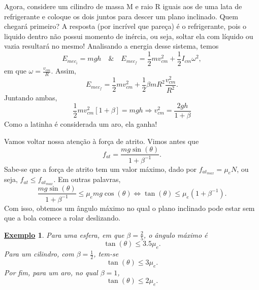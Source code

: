 \documentclass{article}
\newtheorem{example}{\underline{Exemplo}}
\begin{document}
Agora, considere um cilindro de massa M e raio R iguais aos de uma lata de refrigerante e coloque os dois juntos para descer um plano inclinado. Quem chegará primeiro?
A resposta (por incrível que pareça) é o refrigerante, pois o liquido dentro não possui momento de inércia, ou seja, soltar ela com líquido ou vazia resultará no mesmo! Analisando a energia
desse sistema, temos 
\[
  E_{mec_{i}} = mgh\quad \&\quad E_{mec_{f}} = \frac{1}{2}mv_{cm}^{2} + \frac{1}{2}I_{cm}\omega^{2},
\]
em que \(\omega = \frac{v_{cm}}{R}\). Assim, 
\[
  E_{mec_{f}}=\frac{1}{2}mv_{cm}^{2} + \frac{1}{2}\beta mR^{2}\frac{v_{cm}^{2}}{R^{2}}.
\]
Juntando ambas, 
\[
  \frac{1}{2}mv_{cm}^{2}[1+\beta ] = mgh \Rightarrow v_{cm}^{2} = \frac{2gh}{1+\beta }
\]
Como a latinha é considerada um aro, ela ganha!

Vamos voltar nossa atenção à força de atrito. Vimos antes que 
\[
  f_{at} = \frac{mg\sin{(\theta )}}{1 + \beta^{-1}}.
\]
Sabe-se que a força de atrito tem um valor máximo, dado por \(f_{at_{max}} = \mu_{e}N\), ou seja,
\(f_{at}\leq f_{at_{max}}\). Em outras palavras, 
\[
  \frac{mg\sin{(\theta )}}{1+\beta^{-1}}\leq \mu_{e}mg\cos{(\theta )} \Longleftrightarrow \tan{(\theta )}\leq \mu_{e}(1+\beta^{-1}).
\]
Com isso, obtemos um ângulo máximo no qual o plano inclinado pode estar sem que a bola comece a rolar deslizando.
\begin{example}
  Para uma esfera, em que \(\beta =\frac{2}{5}\), o ângulo máximo é 
  \[
    \tan{(\theta )}\leq 3.5\mu_{e}.
  \]
  Para um cilindro, com \(\beta = \frac{1}{2}\), tem-se 
  \[
    \tan{(\theta )}\leq 3\mu_{e}.
  \]
  Por fim, para um aro, no qual \(\beta =1\), 
  \[
    \tan{(\theta )}\leq 2\mu_{e}.
  \]
\end{example}
\end{document}
